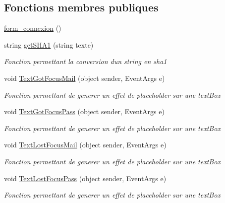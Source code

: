 \subsection*{Fonctions membres publiques}
\begin{DoxyCompactItemize}
\item 
\hyperlink{classforma_1_1form__connexion_af513b641ece43dcd3c005697db5bae42}{form\+\_\+connexion} ()
\item 
string \hyperlink{classforma_1_1form__connexion_acfb9567f7c7bdf51efd82bb39122b777}{get\+S\+H\+A1} (string texte)
\begin{DoxyCompactList}\small\item\em Fonction permettant la conversion d\textquotesingle{}un string en sha1 \end{DoxyCompactList}\item 
void \hyperlink{classforma_1_1form__connexion_a0421dba74a5e124f49aecd57837ce3db}{Text\+Got\+Focus\+Mail} (object sender, Event\+Args e)
\begin{DoxyCompactList}\small\item\em Fonction permettant de generer un effet de placeholder sur une text\+Box \end{DoxyCompactList}\item 
void \hyperlink{classforma_1_1form__connexion_a5d80ace293f05f3b3992cb882530cb85}{Text\+Got\+Focus\+Pass} (object sender, Event\+Args e)
\begin{DoxyCompactList}\small\item\em Fonction permettant de generer un effet de placeholder sur une text\+Box \end{DoxyCompactList}\item 
void \hyperlink{classforma_1_1form__connexion_a2ac84bb15b7027e2c0feba187cb9d741}{Text\+Lost\+Focus\+Mail} (object sender, Event\+Args e)
\begin{DoxyCompactList}\small\item\em Fonction permettant de generer un effet de placeholder sur une text\+Box \end{DoxyCompactList}\item 
void \hyperlink{classforma_1_1form__connexion_af172ef42afc634b218aa5f99da73c9eb}{Text\+Lost\+Focus\+Pass} (object sender, Event\+Args e)
\begin{DoxyCompactList}\small\item\em Fonction permettant de generer un effet de placeholder sur une text\+Box \end{DoxyCompactList}\end{DoxyCompactItemize}
